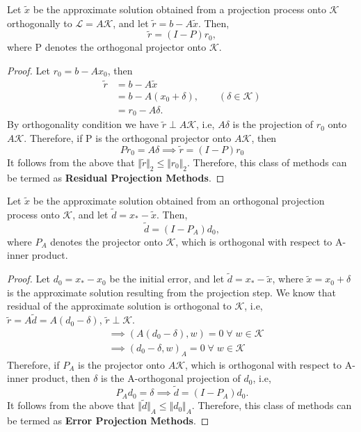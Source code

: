 \documentclass[10pt,a4paper]{article}
\begin{document}
\begin{prop}
Let $\tilde{x}$ be the approximate solution obtained from a projection process onto $\mathcal{K}$ orthogonally to $\mathcal{L}=A\mathcal{K}$, and let $\tilde{r} = b-A\tilde{x}$. Then,
$$\tilde{r}=(I-P)r_0,$$
where P denotes the orthogonal projector onto $\mathcal{K}$.
\end{prop}

\begin{proof}
Let $r_0=b-Ax_0$, then
\begin{align*}
\tilde{r} &= b-A\tilde{x}\\
&= b-A(x_0+\delta),\qquad(\delta\in\mathcal{K})\\
&= r_0-A\delta.
\end{align*}
By orthogonality condition we have $\tilde{r}\perp A\mathcal{K}$, i.e, $A\delta$ is the projection of $r_0$ onto $A\mathcal{K}$. Therefore, if P is the orthogonal projector onto $A\mathcal{K}$, then
$$Pr_0=A\delta \implies \tilde{r}=(I-P)r_0$$
It follows from the above that $\Vert \tilde{r}\Vert_2 \le \Vert r_0\Vert_2.$ Therefore, this class of methods can be termed as \textbf{Residual Projection Methods}.
\end{proof}

\begin{prop}
Let $\tilde{x}$ be the approximate solution obtained from an orthogonal projection process onto $\mathcal{K}$, and let $\tilde{d} = x_*-\tilde{x}$. Then,
$$\tilde{d}=(I-P_A)d_0,$$
where $P_A$ denotes the projector onto $\mathcal{K}$, which is orthogonal with respect to A-inner product.
\end{prop}

\begin{proof}
Let $d_0=x_*-x_0$ be the initial error, and let $\tilde{d}=x_*-\tilde{x}$, where $\tilde{x}=x_0+\delta$ is the approximate solution resulting from the projection step. We know that residual of the approximate solution is orthogonal to $\mathcal{K}$, i.e, $\tilde{r}=A\tilde{d}=A(d_0-\delta)$, $\tilde{r}\perp \mathcal{K}$.
\begin{align*}
&\implies (A(d_0-\delta),w)=0\;\forall\;w\in\mathcal{K} \\
&\implies (d_0-\delta,w)_A=0\;\forall\;w\in\mathcal{K}
\end{align*}
Therefore, if $P_A$ is the projector onto $A\mathcal{K}$, which is orthogonal with respect to A-inner product, then $\delta$ is the A-orthogonal projection of $d_0$, i.e,
$$P_Ad_0=\delta \implies \tilde{d}=(I-P_A)d_0.$$
It follows from the above that $\Vert \tilde{d}\Vert_A \le \Vert d_0\Vert_A.$ Therefore, this class of methods can be termed as \textbf{Error Projection Methods}.
\end{proof}
\end{document}
